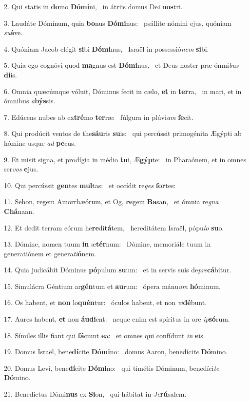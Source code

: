 2. Qui statis in \textbf{do}mo \textbf{Dó}\textbf{mi}ni, \ast\  in átriis domus De\textit{i} \textbf{nos}tri.\

3. Laudáte Dóminum, quia \textbf{bo}nus \textbf{Dó}\textbf{mi}nus: \ast\  psállite nómini ejus, quóniam \textit{su}\textbf{á}ve.\

4. Quóniam Jacob elégit \textbf{si}bi \textbf{Dó}\textbf{mi}nus, \ast\  Israël in possessió\textit{nem} \textbf{si}bi.\

5. Quia ego cognóvi quod \textbf{ma}gnus est \textbf{Dó}\textbf{mi}nus, \ast\  et Deus noster præ ómni\textit{bus} \textbf{di}is.\

6. Omnia quæcúmque vóluit, Dóminus fecit in cælo, \textbf{et} in \textbf{ter}ra, \ast\  in mari, et in ómnibus \textit{a}\textbf{býs}sis.\

7. Edúcens nubes ab ex\textbf{tré}mo \textbf{ter}ræ: \ast\  fúlgura in plúvi\textit{am} \textbf{fe}cit.\

8. Qui prodúcit ventos de the\textbf{sáu}ris \textbf{su}is: \ast\  qui percússit primogénita Ægýpti ab hómine usque \textit{ad} \textbf{pe}cus.\

9. Et misit signa, et prodígia in médio \textbf{tu}i, Æ\textbf{gýp}te: \ast\  in Pharaónem, et in omnes ser\textit{vos} \textbf{e}jus.\

10. Qui percússit \textbf{gen}tes \textbf{mul}tas: \ast\  et occídit re\textit{ges} \textbf{for}tes:\

11. Sehon, regem Amorrhæórum, et Og, \textbf{re}gem \textbf{Ba}san, \ast\  et ómnia re\textit{gna} \textbf{Chá}naan.\

12. Et dedit terram eórum he\textbf{re}di\textbf{tá}tem, \ast\  hereditátem Israël, pópu\textit{lo} \textbf{su}o.\

13. Dómine, nomen tuum \textbf{in} æ\textbf{tér}num: \ast\  Dómine, memoriále tuum in generatiónem et genera\textit{ti}\textbf{ó}nem.\

14. Quia judicábit Dóminus \textbf{pó}pulum \textbf{su}um: \ast\  et in servis suis de\textit{pre}\textbf{cá}bitur.\

15. Simulácra Géntium ar\textbf{gén}tum et \textbf{au}rum: \ast\  ópera mánu\textit{um} \textbf{hó}minum.\

16. Os habent, et \textbf{non} lo\textbf{quén}tur: \ast\  óculos habent, et non \textit{vi}\textbf{dé}bunt.\

17. Aures habent, \textbf{et} non \textbf{áu}\textbf{di}ent: \ast\  neque enim est spíritus in ore \textit{ip}\textbf{só}rum.\

18. Símiles illis fiant qui \textbf{fá}ciunt \textbf{e}a: \ast\  et omnes qui confídunt \textit{in} \textbf{e}is.\

19. Domus Israël, bene\textbf{dí}cite \textbf{Dó}\textbf{mi}no: \ast\  domus Aaron, benedíci\textit{te} \textbf{Dó}mino.\

20. Domus Levi, bene\textbf{dí}cite \textbf{Dó}\textbf{mi}no: \ast\  qui timétis Dóminum, benedíci\textit{te} \textbf{Dó}mino.\

21. Benedíctus Dómi\textbf{nus} ex \textbf{Si}on, \ast\  qui hábitat in \textit{Je}\textbf{rú}salem.\

